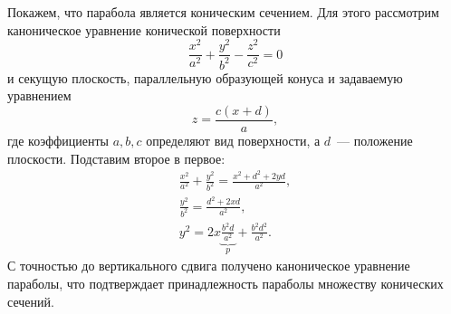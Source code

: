 Покажем, что парабола является коническим сечением. Для этого рассмотрим каноническое уравнение конической поверхности
\begin{equation*}
    \frac{x^2}{a^2} + \frac{y^2}{b^2} - \frac{z^2}{c^2} = 0
\end{equation*}
и секущую плоскость, параллельную образующей конуса и задаваемую уравнением
\begin{equation*}
    z = \frac{c(x + d)}{a},
\end{equation*}
где коэффициенты $a, b, c$ определяют вид поверхности, а $d$~--- положение плоскости. Подставим второе в первое:
\begin{gather*}
    \frac{x^2}{a^2} + \frac{y^2}{b^2} = \frac{x^2 + d^2 + 2yd}{a^2},\\
    \frac{y^2}{b^2} = \frac{d^2 + 2xd}{a^2},\\
    y^2 = 2 x \underbrace{\frac{b^2d}{a^2}}_p + \frac{b^2 d^2}{a^2}.
\end{gather*}
С точностью до вертикального сдвига получено каноническое уравнение параболы, что подтверждает принадлежность параболы множеству конических сечений.

